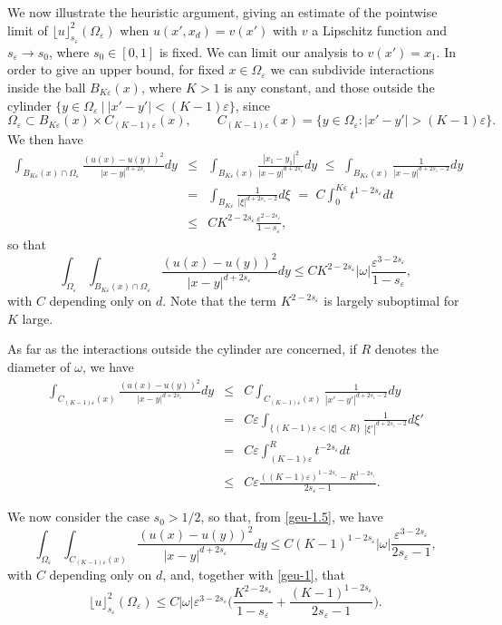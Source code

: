 \documentclass[11pt]{article}
\def\e{\varepsilon}
\begin{document}
\smallskip
We now illustrate the heuristic argument, giving an estimate of the pointwise limit of  $\lfloor u\rfloor_{s_\e}^2(\Omega_\e)$ when
$u(x',x_d)=v(x')$ with $v$ a Lipschitz function and $s_\e\to s_0$, where $s_0\in [0,1]$ is fixed. We can limit our analysis to $v(x')=x_1$. In order to give an upper bound, for fixed $x\in \Omega_\e$ we can subdivide interactions inside the ball $B_{K\e}(x)$, where $K>1$ is any constant, and those outside the cylinder $\{y\in \Omega_{\e}\ |\ |x'-y'|<(K-1)\e\}$, since
$$
\Omega_\e\subset B_{K\e}(x)\times C_{(K-1)\e}(x),\qquad  C_{(K-1)\e}(x)=\{y\in\Omega_\e: |x'-y'|>(K-1)\e\}.
$$
We then have 
\begin{eqnarray*}
\int_{B_{K\e}(x)\cap \Omega_\e}\!\frac{(u(x)-u(y))^2}{|x-y|^{d+2s_\e}}dy
&\le& \int_{B_{K\e}(x)}\!\frac{|x_1-y_1|^2}{|x-y|^{d+2s_\e}}dy
\,\, \le \,\, \int_{B_{K\e}(x)}\frac{1}{|x-y|^{d+2s_\e-2}}dy\\
&=&\int_{B_{K\e}}\frac{1}{|\xi|^{d+2s_\e-2}}d\xi
\,\, =\,\, C\int_0^{K\e}t^{1-2s_\e}dt\\
&\le& CK^{2-2s_\e}\frac{\e^{2-2s_\e}}{1-s_\e},
\end{eqnarray*}
so that
\begin{equation}\label{geu-1}
\int_{\Omega_\e}\int_{B_{K\e}(x)\cap \Omega_\e}\frac{(u(x)-u(y))^2}{|x-y|^{d+2s_\e}}dy\le CK^{2-2s_\e}|\omega|\frac{\e^{3-2s_\e}}{1-s_\e},
\end{equation}
with $C$ depending only on $d$. Note that the term $K^{2-2s_\e}$ is largely suboptimal for $K$ large.

As far as the interactions outside the cylinder are concerned, if $R$ denotes the diameter of $\omega$, we have
\begin{eqnarray}\label{geu-1.5}\nonumber
\int_{ C_{(K-1)\e}(x)}\frac{(u(x)-u(y))^2}{|x-y|^{d+2s_\e}}dy
&\le& C\int_{C_{(K-1)\e}(x)}\frac{1}{|x'-y'|^{d+2s_\e-2}}dy\\
&=&\nonumber
C\e\int_{\{(K-1)\e<|\xi|<R\}}\frac{1}{|\xi'|^{d+2s_\e-2}}d\xi'\\
&=&\nonumber C\e\int_{(K-1)\e}^{R}t^{-2s_\e}dt
\\
&\le&C
\e\frac{((K-1)\e)^{1-2s_\e}-R^{1-2s_\e}}{2s_\e-1}.
\end{eqnarray}

\medskip
{}
We now consider the case $s_0>1/2$,
so that, from \eqref{geu-1.5}, we have 
\begin{equation}
\int_{\Omega_\e}\int_{ C_{(K-1)\e}(x)}\frac{(u(x)-u(y))^2}{|x-y|^{d+2s_\e}}dy
\le C(K-1)^{1-2s_\e}|\omega|\frac{\e^{3-2s_\e}}{2s_\e-1},
\end{equation}
with $C$ depending only on $d$, and, together with \eqref{geu-1}, that 
\begin{equation}\label{geu-2}
\lfloor u\rfloor_{s_\e}^2(\Omega_\e)\le C|\omega|\e^{3-2s_\e}\Big(
\frac{K^{2-2s_\e}}{1-s_\e}+\frac{(K-1)^{1-2s_\e}}{2s_\e-1}\Big).
\end{equation}
\end{document}
